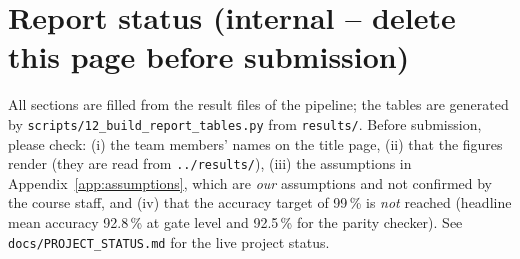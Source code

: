 \section*{Report status (internal -- delete this page before submission)}
All sections are filled from the result files of the pipeline; the tables are generated by \texttt{scripts/12\_build\_report\_tables.py} from \texttt{results/}.
Before submission, please check: (i) the team members' names on the title page, (ii) that the figures render (they are read from \texttt{../results/}),
(iii) the assumptions in Appendix~\ref{app:assumptions}, which are \emph{our} assumptions and not confirmed by the course staff, and
(iv) that the accuracy target of 99\,\% is \emph{not} reached (headline mean accuracy 92.8\,\% at gate level and 92.5\,\% for the parity checker). See \texttt{docs/PROJECT\_STATUS.md} for the live project status.
